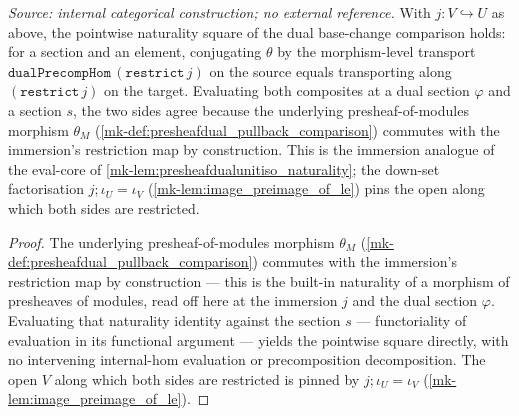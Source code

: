 \begin{lemma}\label{mk-lem:presheafdual_pullback_restrict_natural_apply}
  \leanok

  \textit{Source: internal categorical construction; no external reference.}
  With \(j : V \hookrightarrow U\) as above, the pointwise naturality square of the dual base-change
  comparison holds: for a section and an element, conjugating \(\theta\) by the morphism-level
  transport \(\mathtt{dualPrecompHom}\,(\mathtt{restrict}\,j)\) on the source equals transporting along
  \((\mathtt{restrict}\,j)\) on the target. Evaluating both composites at a dual section \(\varphi\)
  and a section \(s\), the two sides agree because the underlying presheaf-of-modules morphism
  \(\theta_M\) (\ref{mk-def:presheafdual_pullback_comparison}) commutes with the immersion's restriction
  map by construction. This is the immersion analogue of the eval-core of
  \ref{mk-lem:presheafdualunitiso_naturality}; the down-set factorisation
  \(j \mathbin{;} \iota_U = \iota_V\) (\ref{mk-lem:image_preimage_of_le}) pins the open along which both
  sides are restricted.
\end{lemma}
\begin{proof}
  \leanok
  The underlying presheaf-of-modules morphism \(\theta_M\)
  (\ref{mk-def:presheafdual_pullback_comparison}) commutes with the immersion's restriction map by
  construction --- this is the built-in naturality of a morphism of presheaves of modules, read off
  here at the immersion \(j\) and the dual section \(\varphi\). Evaluating that naturality identity
  against the section \(s\) --- functoriality of evaluation in its functional argument --- yields the
  pointwise square directly, with no intervening internal-hom evaluation or precomposition
  decomposition. The open \(V\) along which both sides are restricted is pinned by
  \(j \mathbin{;} \iota_U = \iota_V\) (\ref{mk-lem:image_preimage_of_le}).
\end{proof}

